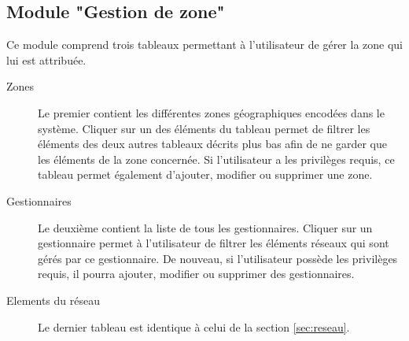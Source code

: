 \documentclass{EPL-master-thesis-covers-FR}
\begin{document}
				
			\subsection{Module "Gestion de zone"}
				Ce module comprend trois tableaux permettant à l'utilisateur de gérer la zone qui lui est attribuée.
				\begin{description}
					\item[Zones] Le premier contient les différentes zones géographiques encodées dans le système. Cliquer sur un des éléments du tableau permet de filtrer les éléments des deux autres tableaux décrits plus bas afin de ne garder que les éléments de la zone concernée. Si l'utilisateur a les privilèges requis, ce tableau permet également d'ajouter, modifier ou supprimer une zone.
					\item[Gestionnaires] Le deuxième contient la liste de tous les gestionnaires. Cliquer sur un gestionnaire permet à l'utilisateur de filtrer les éléments réseaux qui sont gérés par ce gestionnaire. De nouveau, si l'utilisateur possède les privilèges requis, il pourra ajouter, modifier ou supprimer des gestionnaires.
					\item [Elements du réseau] Le dernier tableau est identique à celui de la section \ref{sec:reseau}.
				\end{description}
				
			
\end{document}
